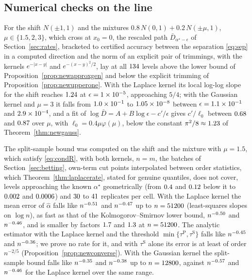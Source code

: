 \subsection{Numerical checks on the line}
\label{sec:newnumerics}
\label{sec:excessmc}

For the shift $N(\pm1,1)$ and the mixtures $0.8\,N(0,1)+0.2\,N(\pm\mu,1)$, $\mu\in\{1.5,2,3\}$, which cross at $x_0=0$,
the rescaled path $\bar D_{\alpha^\star-\epsilon}$ of Section~\ref{sec:rates}, bracketed to certified accuracy between the separation
\eqref{eq:sep} in a computed direction and the norm of an explicit pair of trimmings, with the kernels $e^{-|x-y|}$ and
$e^{-(x-y)^2/2}$, lay at all $134$ levels above the lower bound of Proposition~\ref{prop:newapproxgen} and below the
explicit trimming of Proposition~\ref{prop:newupperone}. With the Laplace kernel its local log-log slope for the shift
reaches $1.24$ at $\epsilon=1\times10^{-5}$, approaching $5/4$; with the Gaussian kernel and $\mu=3$ it falls
from $1.0\times10^{-1}$ to $1.05\times10^{-8}$ between $\epsilon=1.1\times10^{-1}$ and $2.9\times10^{-4}$, and a fit of
$\log\bar D=A+B\log\epsilon-c'/\epsilon$ gives $c'/\ell_0$ between $0.68$ and $0.87$ over $\mu$, with
$\ell_0=0.4\mu\varphi(\mu)$, below the constant $\pi^2/8\approx1.23$ of Theorem~\ref{thm:newgauss}.

The split-sample bound was computed on the shift and the mixture with $\mu=1.5$, which satisfy \eqref{eq:condR}, with
both kernels, $n=m$, the batches of Section~\ref{sec:betting}, own-term cut points interpolated between order
statistics, which Theorem~\ref{thm:laplacerate}, stated for genuine quantiles, does not cover, levels approaching the
known $\alpha^\star$ geometrically (from $0.4$ and $0.12$ below it to $0.002$ and $0.0006$) and
$30$ to $41$ replicates per cell. With the Laplace kernel the mean error of $\widehat\alpha$ falls like $n^{-0.51}$
and $n^{-0.47}$ up to $n=51200$ (least-squares slopes on $\log n$), as fast as that of the
Kolmogorov--Smirnov lower bound, $n^{-0.50}$ and $n^{-0.46}$, and is smaller by factors $1.7$ and
$1.3$ at $n=51200$. The analytic estimator with the Laplace kernel and the threshold
$\min\{\tau^{\mathrm P},\tau^{\mathrm S}\}$ falls like $n^{-0.45}$ and $n^{-0.36}$; we prove no rate for
it, and with $\tau^{\mathrm S}$ alone its error is at least of order $n^{-2/5}$ (Proposition~\ref{prop:newconverse}).
With the Gaussian kernel the split-sample bound falls like $n^{-0.35}$ and $n^{-0.38}$ up to
$n=12800$, against $n^{-0.57}$ and $n^{-0.46}$ for the Laplace kernel over the same
range.

